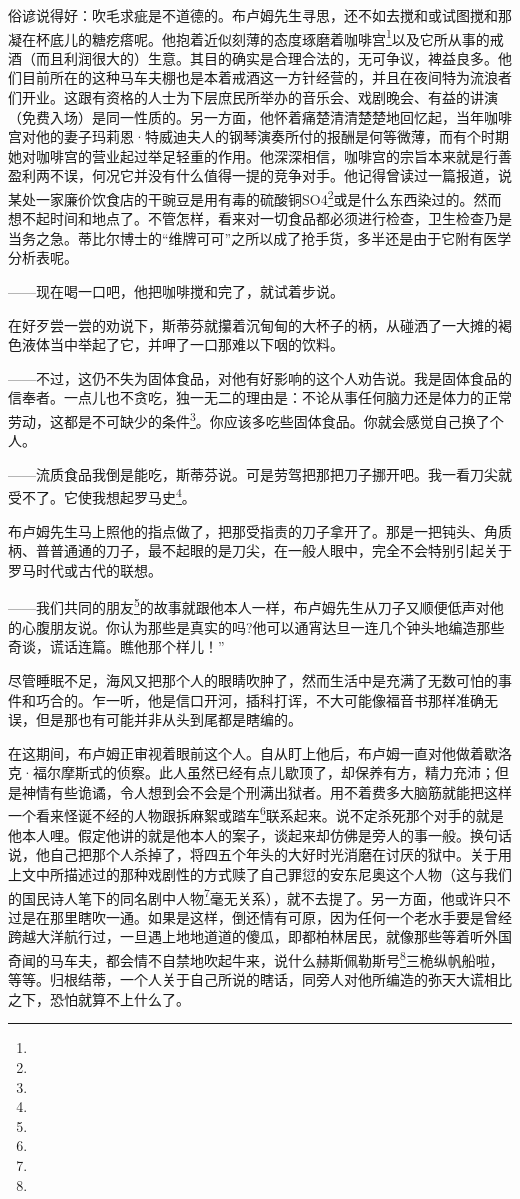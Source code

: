 \par 俗谚说得好：吹毛求疵是不道德的。布卢姆先生寻思，还不如去搅和或试图搅和那凝在杯底儿的糖疙瘩呢。他抱着近似刻薄的态度琢磨着咖啡宫\footnote{}以及它所从事的戒酒（而且利润很大的）生意。其目的确实是合理合法的，无可争议，裨益良多。他们目前所在的这种马车夫棚也是本着戒酒这一方针经营的，并且在夜间特为流浪者们开业。这跟有资格的人士为下层庶民所举办的音乐会、戏剧晚会、有益的讲演（免费入场）是同一性质的。另一方面，他怀着痛楚清清楚楚地回忆起，当年咖啡宫对他的妻子玛莉恩·特威迪夫人的钢琴演奏所付的报酬是何等微薄，而有个时期她对咖啡宫的营业起过举足轻重的作用。他深深相信，咖啡宫的宗旨本来就是行善盈利两不误，何况它并没有什么值得一提的竞争对手。他记得曾读过一篇报道，说某处一家廉价饮食店的干豌豆是用有毒的硫酸铜SO4\footnote{}或是什么东西染过的。然而想不起时间和地点了。不管怎样，看来对一切食品都必须进行检查，卫生检查乃是当务之急。蒂比尔博士的“维牌可可”之所以成了抢手货，多半还是由于它附有医学分析表呢。
\par ——现在喝一口吧，他把咖啡搅和完了，就试着步说。
\par 在好歹尝一尝的劝说下，斯蒂芬就攥着沉甸甸的大杯子的柄，从碰洒了一大摊的褐色液体当中举起了它，并呷了一口那难以下咽的饮料。
\par ——不过，这仍不失为固体食品，对他有好影响的这个人劝告说。我是固体食品的信奉者。一点儿也不贪吃，独一无二的理由是：不论从事任何脑力还是体力的正常劳动，这都是不可缺少的条件\footnote{}。你应该多吃些固体食品。你就会感觉自己换了个人。
\par ——流质食品我倒是能吃，斯蒂芬说。可是劳驾把那把刀子挪开吧。我一看刀尖就受不了。它使我想起罗马史\footnote{}。
\par 布卢姆先生马上照他的指点做了，把那受指责的刀子拿开了。那是一把钝头、角质柄、普普通通的刀子，最不起眼的是刀尖，在一般人眼中，完全不会特别引起关于罗马时代或古代的联想。
\par ——我们共同的朋友\footnote{}的故事就跟他本人一样，布卢姆先生从刀子又顺便低声对他的心腹朋友说。你认为那些是真实的吗?他可以通宵达旦一连几个钟头地编造那些奇谈，谎话连篇。瞧他那个样儿！”
\par 尽管睡眠不足，海风又把那个人的眼睛吹肿了，然而生活中是充满了无数可怕的事件和巧合的。乍一听，他是信口开河，插科打诨，不大可能像福音书那样准确无误，但是那也有可能并非从头到尾都是瞎编的。
\par 在这期间，布卢姆正审视着眼前这个人。自从盯上他后，布卢姆一直对他做着歇洛克·福尔摩斯式的侦察。此人虽然已经有点儿歇顶了，却保养有方，精力充沛；但是神情有些诡谲，令人想到会不会是个刑满出狱者。用不着费多大脑筋就能把这样一个看来怪诞不经的人物跟拆麻絮或踏车\footnote{}联系起来。说不定杀死那个对手的就是他本人哩。假定他讲的就是他本人的案子，谈起来却仿佛是旁人的事一般。换句话说，他自己把那个人杀掉了，将四五个年头的大好时光消磨在讨厌的狱中。关于用上文中所描述过的那种戏剧性的方式赎了自己罪愆的安东尼奥这个人物（这与我们的国民诗人笔下的同名剧中人物\footnote{}毫无关系），就不去提了。另一方面，他或许只不过是在那里瞎吹一通。如果是这样，倒还情有可原，因为任何一个老水手要是曾经跨越大洋航行过，一旦遇上地地道道的傻瓜，即都柏林居民，就像那些等着听外国奇闻的马车夫，都会情不自禁地吹起牛来，说什么赫斯佩勒斯号\footnote{}三桅纵帆船啦，等等。归根结蒂，一个人关于自己所说的瞎话，同旁人对他所编造的弥天大谎相比之下，恐怕就算不上什么了。
